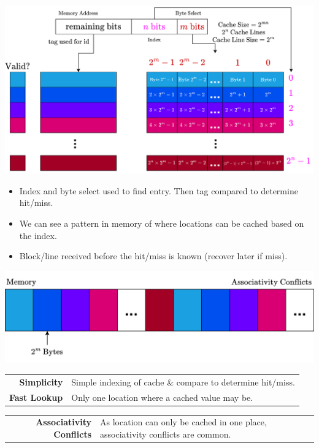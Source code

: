 \begin{center}
    \includegraphics[width=.9\textwidth]{caches/images/direct_mapped_cache.drawio.png}
\end{center}
\begin{itemize}
    \item Index and byte select used to find entry. Then tag compared to determine hit/miss.
    \item We can see a pattern in memory of where locations can be cached based on the index.
    \item Block/line received before the hit/miss is known (recover later if miss).
\end{itemize}
\begin{center}
    \includegraphics[width=.9\textwidth]{caches/images/associativity_conflicts.drawio.png}
\end{center}
\begin{prosbox}
    \begin{center}
        \begin{tabular}{r p{}}
            \textbf{Simplicity} & Simple indexing of cache \& compare to determine hit/miss. \\
            \textbf{Fast Lookup} & Only one location where a cached value may be. \\
        \end{tabular}
    \end{center}
\end{prosbox}
\begin{consbox}
    \begin{center}
        \begin{tabular}{r p{}}
            \textbf{Associativity Conflicts} & As location can only be cached in one place, associativity conflicts are common. \\
        \end{tabular}
    \end{center}
\end{consbox}

